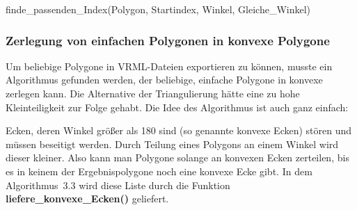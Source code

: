 \begin{function}[!ht]
	\caption{finde\_passenden\_Index(Polygon, Startindex, Winkel, Gleiche\_Winkel)}
	
	\BlankLine
\end{function}

\clearpage

\subsubsection{Zerlegung von einfachen Polygonen in konvexe Polygone}\label{Zerlegung}

Um beliebige Polygone in VRML-Dateien exportieren zu können, musste ein Algorithmus gefunden werden, der beliebige, einfache Polygone in konvexe zerlegen kann. Die Alternative der Triangulierung hätte eine zu hohe Kleinteiligkeit zur Folge gehabt. Die Idee des Algorithmus ist auch ganz einfach:

Ecken, deren Winkel größer als 180\degree\/ sind (so genannte konvexe Ecken) stören und müssen beseitigt werden. Durch Teilung eines Polygons an einem Winkel wird dieser kleiner. Also kann man Polygone solange an konvexen Ecken zerteilen, bis es in keinem der Ergebnispolygone noch eine konvexe Ecke gibt. In dem Algorithmus~3.3 wird diese Liste durch die Funktion \textbf{liefere\_konvexe\_Ecken()} geliefert.

